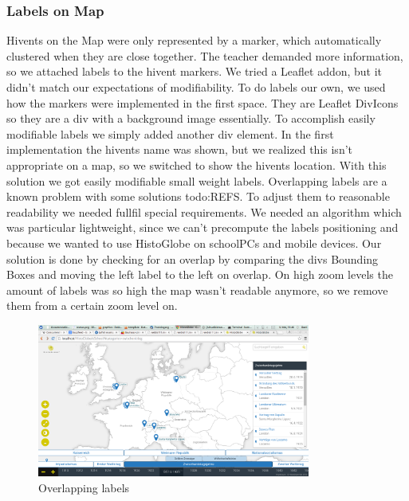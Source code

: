 \subsubsection{Labels on Map}
Hivents on the Map were only represented by a marker, which automatically clustered when they are close together.
The teacher demanded more information, so we attached labels to the hivent markers.
We tried a Leaflet addon, but it didn't match our expectations of modifiability.
To do labels our own, we used how the markers were implemented in the first space. They are Leaflet DivIcons so they are a div with a background image essentially. To accomplish easily modifiable labels we simply added another div element.
In the first implementation the hivents name was shown, but we realized this isn't appropriate on a map, so we switched to show the hivents location. With this solution we got easily modifiable small weight labels.
Overlapping labels are a known problem with some solutions todo:REFS.
To adjust them to reasonable readability we needed fullfil special requirements.
We needed an algorithm which was particular lightweight, since we can't precompute the labels positioning and because we wanted to use HistoGlobe on schoolPCs and mobile devices.
Our solution is done by checking for an overlap by comparing the divs Bounding Boxes and moving the left label to the left on overlap.
On high zoom levels the amount of labels was so high the map wasn't readable anymore, so we remove them from a certain zoom level on.

  \begin{figure}[here]
\begin{center}
  \includegraphics[width=0.8\textwidth]{graphics/overlapping_labels.png}
  \end{center}

  \caption{Overlapping labels}
  \label{fig:overlapping_labels}
  \end{figure}


